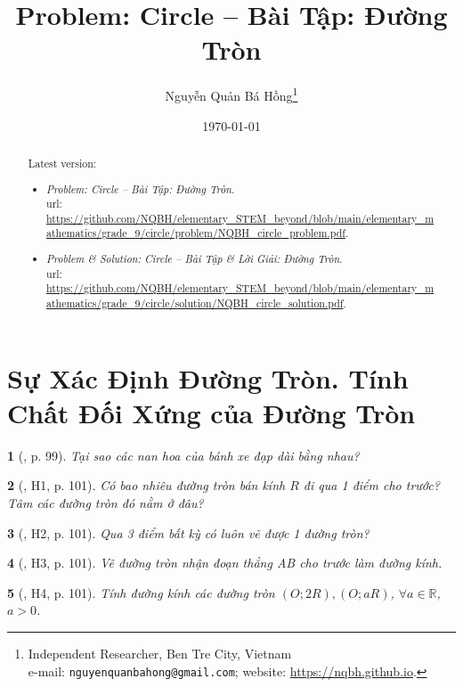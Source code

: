 \documentclass{article}
\title{Problem: Circle -- Bài Tập: Đường Tròn}
\author{Nguyễn Quản Bá Hồng\footnote{Independent Researcher, Ben Tre City, Vietnam\\e-mail: \texttt{nguyenquanbahong@gmail.com}; website: \url{https://nqbh.github.io}.}}
\date{\today}
\newtheorem{baitoan}{}
\begin{document}
\maketitle
\begin{abstract}
	Latest version:
	\begin{itemize}
		\item \textit{Problem: Circle -- Bài Tập: Đường Tròn}.\\{\sc url}: \url{https://github.com/NQBH/elementary_STEM_beyond/blob/main/elementary_mathematics/grade_9/circle/problem/NQBH_circle_problem.pdf}.
		\item \textit{Problem \& Solution: Circle -- Bài Tập \& Lời Giải: Đường Tròn}.\\{\sc url}: \url{https://github.com/NQBH/elementary_STEM_beyond/blob/main/elementary_mathematics/grade_9/circle/solution/NQBH_circle_solution.pdf}.
	\end{itemize}
\end{abstract}
\tableofcontents


\section{Sự Xác Định Đường Tròn. Tính Chất Đối Xứng của Đường Tròn}

\begin{baitoan}[\cite{Binh_boi_duong_Toan_9_tap_1}, p. 99]
	Tại sao các nan hoa của bánh xe đạp dài bằng nhau?
\end{baitoan}

\begin{baitoan}[\cite{Binh_boi_duong_Toan_9_tap_1}, H1, p. 101]
	Có bao nhiêu đường tròn bán kính $R$ đi qua 1 điểm cho trước? Tâm các đường tròn đó nằm ở đâu?
\end{baitoan}

\begin{baitoan}[\cite{Binh_boi_duong_Toan_9_tap_1}, H2, p. 101]
	Qua 3 điểm bất kỳ có luôn vẽ được 1 đường tròn?
\end{baitoan}

\begin{baitoan}[\cite{Binh_boi_duong_Toan_9_tap_1}, H3, p. 101]
	Vẽ đường tròn nhận đoạn thẳng AB cho trước làm đường kính.
\end{baitoan}

\begin{baitoan}[\cite{Binh_boi_duong_Toan_9_tap_1}, H4, p. 101]
	Tính đường kính các đường tròn $(O;2R),(O;aR)$, $\forall a\in\mathbb{R}$, $a > 0$.
\end{baitoan}
\end{document}
